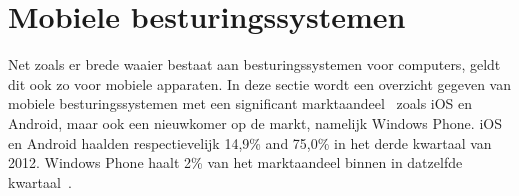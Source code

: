 



\section{Mobiele besturingssystemen}
\label{sec:mobiele-besturingssystemen}
Net zoals er brede waaier bestaat aan besturingssystemen voor computers, geldt dit ook zo voor mobiele apparaten. 
In deze sectie wordt een overzicht gegeven van mobiele besturingssystemen met een significant marktaandeel~\cite{David2011, Hales2012} zoals iOS en Android, maar ook een nieuwkomer op de markt, namelijk Windows Phone.
iOS en Android haalden respectievelijk 14,9\% and 75,0\% in het derde kwartaal van 2012.
Windows Phone haalt 2\% van het marktaandeel binnen in datzelfde kwartaal~\cite{Protalinski2012}.

